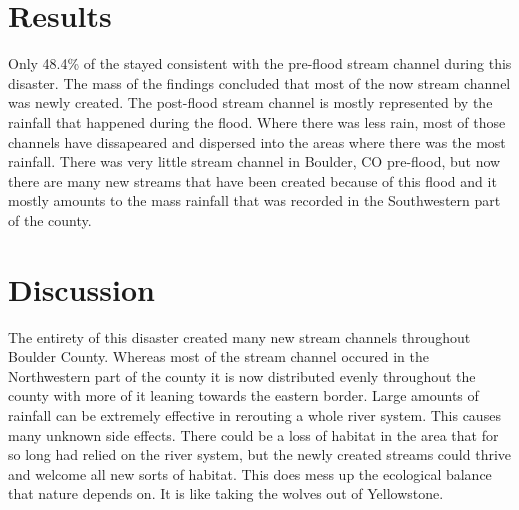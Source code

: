 \documentclass[twoside]{article}
\begin{document}
\begin{multicols}{2}

\section{Results}


Only 48.4\% of the stayed consistent with the pre-flood stream channel during this disaster. The mass of the findings concluded that most of the now stream channel was newly created. The post-flood stream channel is mostly represented by the rainfall that happened during the flood. Where there was less rain, most of those channels have dissapeared and dispersed into the areas where there was the most rainfall. There was very little stream channel in Boulder, CO pre-flood, but now there are many new streams that have been created because of this flood and it mostly amounts to the mass rainfall that was recorded in the Southwestern part of the county. 




\section{Discussion}

The entirety of this disaster created many new stream channels throughout Boulder County. Whereas most of the stream channel occured in the Northwestern part of the county it is now distributed evenly throughout the county with more of it leaning towards the eastern border. Large amounts of rainfall can be extremely effective in rerouting a whole river system. This causes many unknown side effects. There could be a loss of habitat in the area that for so long had relied on the river system, but the newly created streams could thrive and welcome all new sorts of habitat. This does mess up the ecological balance that nature depends on. It is like taking the wolves out of Yellowstone.



\end{multicols}
\end{document}
